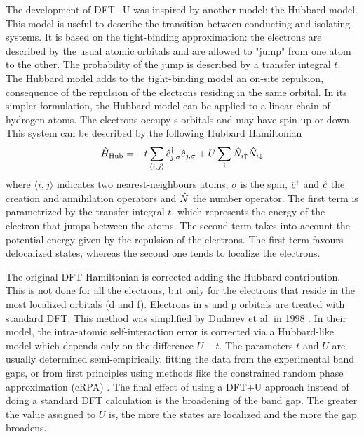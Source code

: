 The development of DFT+U was inspired by another model: the Hubbard model. This model is useful to describe the transition between conducting and isolating systems. It is based on the tight-binding approximation: the electrons are described by the usual atomic orbitals and are allowed to "jump" from one atom to the other. The probability of the jump is described by a transfer integral $t$. The Hubbard model adds to the tight-binding model an on-site repulsion, consequence of the repulsion of the electrons residing in the same orbital. In its simpler formulation, the Hubbard model can be applied to a linear chain of hydrogen atoms. The electrons occupy s orbitals and may have spin up or down. This system can be described by the following Hubbard Hamiltonian
\begin{equation}
    \hat{H}_\text{Hub} = -t \sum_{\langle i,j \rangle} \hat{c}^\dagger_{j,\sigma}\hat{c}_{j,\sigma} + U \sum_i \hat{N}_{i\uparrow} \hat{N}_{i\downarrow}
\end{equation}
where $\langle i,j \rangle$ indicates two nearest-neighbours atoms, $\sigma$ is the spin, $\hat{c}^\dagger$ and $\hat{c}$ the creation and annihilation operators and $\hat{N}$ the number operator. The first term is parametrized by the transfer integral $t$, which represents the energy of the electron that jumps between the atoms. The second term takes into account the potential energy given by the repulsion of the electrons. The first term favours delocalized states, whereas the second one tends to localize the electrons.

The original DFT Hamiltonian is corrected adding the Hubbard contribution. This is not done for all the electrons, but only for the electrons that reside in the most localized orbitals (d and f). Electrons in s and p orbitals are treated with standard DFT. This method was simplified by Dudarev et al. in 1998 \cite{dudarev1998}. In their model, the intra-atomic self-interaction error is corrected via a Hubbard-like model which depends only on the difference $U-t$. The parameters $t$ and $U$ are usually determined semi-empirically, fitting the data from the experimental band gaps, or from first principles using methods like the constrained random phase approximation (cRPA) \cite{aryasetiawan2006}. The final effect of using a DFT+U approach instead of doing a standard DFT calculation is the broadening of the band gap. The greater the value assigned to $U$ is, the more the states are localized and the more the gap broadens.


